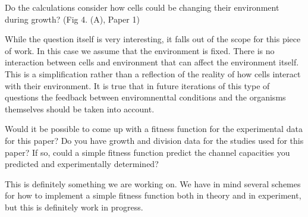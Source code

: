 \begin{tcolorbox}
Do the calculations consider how cells could be changing their environment
during growth? (Fig 4. (A), Paper 1)
\end{tcolorbox}
While the question itself is very interesting, it falls out of the scope for
this piece of work. In this case we assume that the environment is fixed. There
is no interaction between cells and environment that can affect the environment
itself. This is a simplification rather than a reflection of the reality of how
cells interact with their environment. It is true that in future iterations of
this type of questions the feedback between enviromnenttal conditions and the
organisms themselves should be taken into account.

\begin{tcolorbox}
Would it be possible to come up with a fitness function for the experimental
data for this paper? Do you have growth and division data for the studies used
for this paper? If so, could a simple fitness function predict the channel
capacities you predicted and experimentally determined?
\end{tcolorbox}
This is definitely something we are working on. We have in mind several schemes
for how to implement a simple fitness function both in theory and in experiment,
but this is definitely work in progress.
